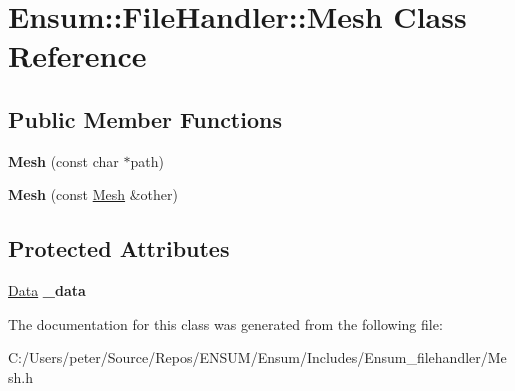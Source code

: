 \hypertarget{class_ensum_1_1_file_handler_1_1_mesh}{}\section{Ensum\+:\+:File\+Handler\+:\+:Mesh Class Reference}
\label{class_ensum_1_1_file_handler_1_1_mesh}
\subsection*{Public Member Functions}
\begin{DoxyCompactItemize}
\item 
{\bfseries Mesh} (const char $\ast$path)\hypertarget{class_ensum_1_1_file_handler_1_1_mesh_a40a76db2b735e5939023f3fd9154cc07}{}\label{class_ensum_1_1_file_handler_1_1_mesh_a40a76db2b735e5939023f3fd9154cc07}

\item 
{\bfseries Mesh} (const \hyperlink{class_ensum_1_1_file_handler_1_1_mesh}{Mesh} \&other)\hypertarget{class_ensum_1_1_file_handler_1_1_mesh_ac3d565bc063a5c6881c3ae0d13aa3808}{}\label{class_ensum_1_1_file_handler_1_1_mesh_ac3d565bc063a5c6881c3ae0d13aa3808}

\end{DoxyCompactItemize}
\subsection*{Protected Attributes}
\begin{DoxyCompactItemize}
\item 
\hyperlink{struct_ensum_1_1_file_handler_1_1_data}{Data} {\bfseries \+\_\+data}\hypertarget{class_ensum_1_1_file_handler_1_1_mesh_ae2c87be19b8db4b742f5aee9e356d02b}{}\label{class_ensum_1_1_file_handler_1_1_mesh_ae2c87be19b8db4b742f5aee9e356d02b}

\end{DoxyCompactItemize}


The documentation for this class was generated from the following file\+:\begin{DoxyCompactItemize}
\item 
C\+:/\+Users/peter/\+Source/\+Repos/\+E\+N\+S\+U\+M/\+Ensum/\+Includes/\+Ensum\+\_\+filehandler/Mesh.\+h\end{DoxyCompactItemize}
